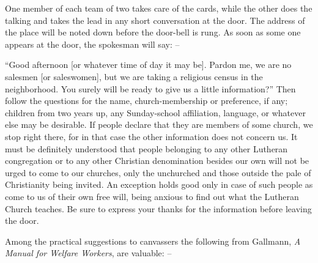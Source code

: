 \documentclass[
]{book}
\begin{document}
One member of each team of two takes care of the cards, while the other does the talking and takes the lead in any short conversation at the door. The address of the place will be noted down before the door-bell is rung. As soon as some one appears at the door, the spokesman will say: --

``Good afternoon {[}or whatever time of day it may be{]}. Pardon me, we are no salesmen {[}or saleswomen{]}, but we are taking a religious census in the neighborhood. You surely will be ready to give us a little information?'' Then follow the questions for the name, church-membership or preference, if any; children from two years up, any Sunday-school affiliation, language, or whatever else may be desirable. If people declare that they are members of some church, we stop right there, for in that case the other information does not concern us. It must be definitely understood that people belonging to any other Lutheran congregation or to any other Christian denomination besides our own will not be urged to come to our churches, only the unchurched and those outside the pale of Christianity being invited. An exception holds good only in case of such people as come to us of their own free will, being anxious to find out what the Lutheran Church teaches. Be sure to express your thanks for the information before leaving the door.

Among the practical suggestions to canvassers the following from Gallmann, \emph{A Manual for Welfare Workers}, are valuable: --
\end{document}
